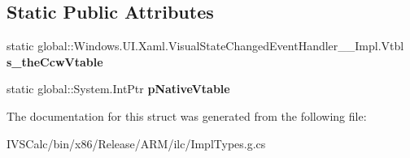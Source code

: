 \subsection*{Static Public Attributes}
\begin{DoxyCompactItemize}
\item 
\mbox{\label{struct_windows_1_1_u_i_1_1_xaml_1_1_visual_state_changed_event_handler_____impl_1_1_vtbl_aefcd0a4874c97dd9efacfa7d19170e73}} 
static global\+::\+Windows.\+U\+I.\+Xaml.\+Visual\+State\+Changed\+Event\+Handler\+\_\+\+\_\+\+Impl.\+Vtbl {\bfseries s\+\_\+the\+Ccw\+Vtable}
\item 
\mbox{\label{struct_windows_1_1_u_i_1_1_xaml_1_1_visual_state_changed_event_handler_____impl_1_1_vtbl_ad58461887267634e64ff175dfbb56daf}} 
static global\+::\+System.\+Int\+Ptr {\bfseries p\+Native\+Vtable}
\end{DoxyCompactItemize}


The documentation for this struct was generated from the following file\+:\begin{DoxyCompactItemize}
\item 
I\+V\+S\+Calc/bin/x86/\+Release/\+A\+R\+M/ilc/Impl\+Types.\+g.\+cs\end{DoxyCompactItemize}
